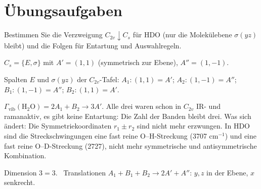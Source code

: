 \section{Übungsaufgaben}

\begin{aufgabe}
Bestimmen Sie die Verzweigung $C_{2v}\downarrow C_s$ für $\mathrm{HDO}$ (nur die Molekülebene $\sigma(yz)$ bleibt) und die Folgen für Entartung und Auswahlregeln.

\loesung
{}
$C_s = \{E, \sigma\}$ mit $A' = (1, 1)$ (symmetrisch zur Ebene), $A'' = (1, -1)$.

Spalten $E$ und $\sigma(yz)$ der $C_{2v}$-Tafel: $A_1\colon(1, 1) = A'$; $A_2\colon(1, -1) = A''$; $B_1\colon(1, -1) = A''$; $B_2\colon(1, 1) = A'$.

$\Gamma_{\mathrm{vib}}(\mathrm{H_2O}) = 2A_1 + B_2\to3A'$. Alle drei waren schon in $C_{2v}$ IR- und ramanaktiv, es gibt keine Entartung: Die Zahl der Banden bleibt drei. Was sich ändert: Die Symmetriekoordinaten $r_1\pm r_2$ sind nicht mehr erzwungen. In $\mathrm{HDO}$ sind die Streckschwingungen eine fast reine O--H-Streckung (3707 cm$^{-1}$) und eine fast reine O--D-Streckung (2727), nicht mehr symmetrische und antisymmetrische Kombination.

Dimension $3 = 3$. \checkmark\ Translationen $A_1 + B_1 + B_2\to2A' + A''$: $y, z$ in der Ebene, $x$ senkrecht. \checkmark

\begin{center}
\begin{minipage}{0.88\textwidth}
\end{minipage}
\end{center}
\end{aufgabe}

